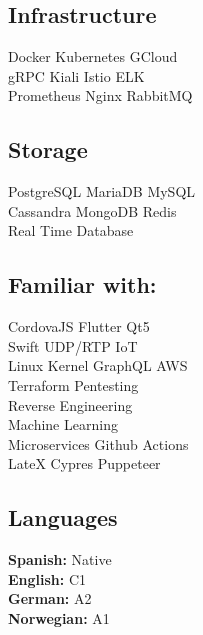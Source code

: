 \documentclass[]{resume}
\begin{document}
\begin{minipage}[t]{0.33\textwidth}
\subsection{Infrastructure}
Docker \textbullet{} Kubernetes \textbullet{} GCloud \\
gRPC \textbullet{} Kiali \textbullet{} Istio \textbullet{} ELK \\
Prometheus \textbullet{}  Nginx \textbullet{} RabbitMQ\newline


\subsection{Storage}
PostgreSQL \textbullet{} MariaDB \textbullet{} MySQL\\
Cassandra \textbullet{} MongoDB \textbullet{} Redis\\
Real Time Database\newline

\subsection{Familiar with:}
\ello
CordovaJS \textbullet{} Flutter \textbullet{} Qt5\\
Swift \textbullet{} UDP/RTP  \textbullet{} IoT \\
Linux Kernel \textbullet{}  GraphQL \textbullet{} AWS\\
Terraform \textbullet{} Pentesting\\
Reverse Engineering\\
Machine Learning\\
Microservices \textbullet{} Github Actions\\
LateX \textbullet{} Cypres \textbullet{} Puppeteer\newline

\sectionsep

\subsection{Languages}

\textbf{Spanish:} Native\\
\textbf{English:} C1\\
\textbf{German:} A2\\
\textbf{Norwegian:} A1
%
%

\end{minipage} 
\hfill
\end{document}
